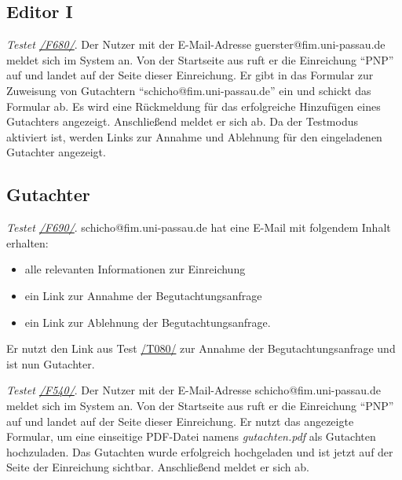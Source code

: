 \subsection{Editor I}
\begin{description}

	 \emph{Testet \hyperref[funkt:680]{/F680/}}.
	Der Nutzer mit der E-Mail-Adresse guerster@fim.uni-passau.de meldet sich im System an.
	Von der Startseite aus ruft er die Einreichung ``P\neq NP'' auf und landet auf der Seite dieser Einreichung.
	Er gibt in das Formular zur Zuweisung von Gutachtern ``schicho@fim.uni-passau.de'' ein und schickt das Formular ab.
	Es wird eine Rückmeldung für das erfolgreiche Hinzufügen eines Gutachters angezeigt.
	Anschließend meldet er sich ab.
	Da der Testmodus aktiviert ist, werden Links zur Annahme und Ablehnung für den eingeladenen Gutachter angezeigt.

\end{description}

\subsection{Gutachter}
\begin{description}

	 \emph{Testet \hyperref[funkt:690]{/F690/}}.
	schicho@fim.uni-passau.de hat eine E-Mail mit folgendem Inhalt erhalten:
	\begin{itemize}
		\item alle relevanten Informationen zur Einreichung
		\item ein Link zur Annahme der Begutachtungsanfrage
		\item ein Link zur Ablehnung der Begutachtungsanfrage.
	\end{itemize}
	Er nutzt den Link aus Test \hyperref[t080]{/T080/} zur Annahme der Begutachtungsanfrage und ist nun Gutachter.

	 \emph{Testet \hyperref[funkt:540]{/F540/}}.
	Der Nutzer mit der E-Mail-Adresse schicho@fim.uni-passau.de meldet sich im System an.
	Von der Startseite aus ruft er die Einreichung ``P\neq NP'' auf und landet auf der Seite dieser Einreichung.
	Er nutzt das angezeigte Formular, um eine einseitige PDF-Datei namens \emph{gutachten.pdf} als Gutachten hochzuladen.
	Das Gutachten wurde erfolgreich hochgeladen und ist jetzt auf der Seite der Einreichung sichtbar.
	Anschließend meldet er sich ab.

\end{description}

